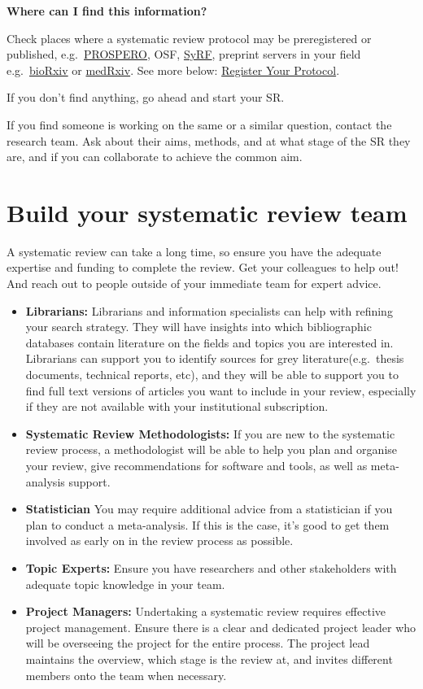 \documentclass[
]{book}
\begin{document}
\textbf{Where can I find this information?}

Check places where a systematic review protocol may be preregistered or published, e.g.~\href{https://www.crd.york.ac.uk/prospero/}{PROSPERO}, OSF, \href{https://syrf.org.uk/}{SyRF}, preprint servers in your field e.g.~\href{https://www.biorxiv.org/}{bioRxiv} or \href{https://www.medrxiv.org/}{medRxiv}. See more below: \protect\hyperlink{register-your-protocol}{Register Your Protocol}.

If you don't find anything, go ahead and start your SR.

If you find someone is working on the same or a similar question, contact the research team. Ask about their aims, methods, and at what stage of the SR they are, and if you can collaborate to achieve the common aim.

\hypertarget{build-your-systematic-review-team}{%
\section{Build your systematic review team}\label{build-your-systematic-review-team}}

A systematic review can take a long time, so ensure you have the adequate expertise and funding to complete the review. Get your colleagues to help out! And reach out to people outside of your immediate team for expert advice.

\begin{itemize}
\item
  \textbf{Librarians:} Librarians and information specialists can help with refining your search strategy. They will have insights into which bibliographic databases contain literature on the fields and topics you are interested in. Librarians can support you to identify sources for grey literature(e.g.~thesis documents, technical reports, etc), and they will be able to support you to find full text versions of articles you want to include in your review, especially if they are not available with your institutional subscription.
\item
  \textbf{Systematic Review Methodologists:} If you are new to the systematic review process, a methodologist will be able to help you plan and organise your review, give recommendations for software and tools, as well as meta-analysis support.
\item
  \textbf{Statistician} You may require additional advice from a statistician if you plan to conduct a meta-analysis. If this is the case, it's good to get them involved as early on in the review process as possible.
\item
  \textbf{Topic Experts:} Ensure you have researchers and other stakeholders with adequate topic knowledge in your team.
\item
  \textbf{Project Managers:} Undertaking a systematic review requires effective project management. Ensure there is a clear and dedicated project leader who will be overseeing the project for the entire process. The project lead maintains the overview, which stage is the review at, and invites different members onto the team when necessary.
\end{itemize}
\end{document}
